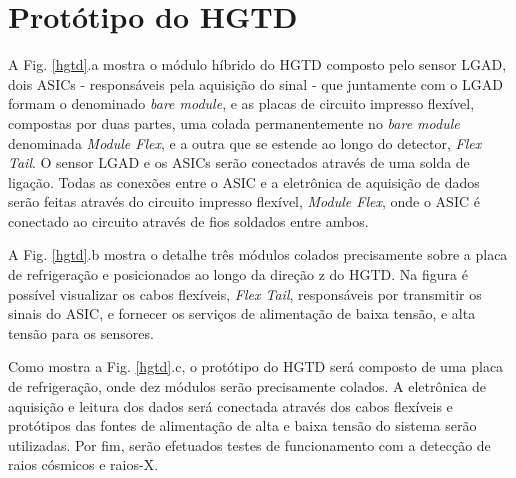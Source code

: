\section{Protótipo do HGTD}

A Fig. \ref{hgtd}.a mostra o módulo híbrido do HGTD composto pelo sensor LGAD, dois ASICs - responsáveis pela aquisição do sinal - que juntamente com o LGAD formam o denominado \textit{bare module}, e as placas de circuito impresso flexível, compostas por duas partes, uma colada permanentemente no \textit{bare module} denominada \textit{Module Flex}, e a outra que se estende ao longo do detector, \textit{Flex Tail}. O sensor LGAD e os ASICs serão conectados através de uma solda de ligação. Todas as conexões entre o ASIC e a eletrônica de aquisição de dados serão feitas através do circuito impresso flexível, \textit{Module Flex}, onde o ASIC é conectado ao circuito através de fios soldados entre ambos.    

A Fig. \ref{hgtd}.b mostra o detalhe três módulos colados precisamente sobre a placa de refrigeração e posicionados ao longo da direção z do HGTD. Na figura é possível visualizar os cabos flexíveis, \textit{Flex Tail}, responsáveis por transmitir os sinais do ASIC, e fornecer os serviços de alimentação de baixa tensão, e alta tensão para os sensores. 

Como mostra a Fig. \ref{hgtd}.c, o protótipo do HGTD será composto de uma placa de refrigeração, onde dez módulos serão precisamente colados. A eletrônica de aquisição e leitura dos dados será conectada através dos cabos flexíveis e protótipos das fontes de alimentação de alta e baixa tensão do sistema serão utilizadas. Por fim, serão efetuados testes de funcionamento com a detecção de raios cósmicos e raios-X.    


